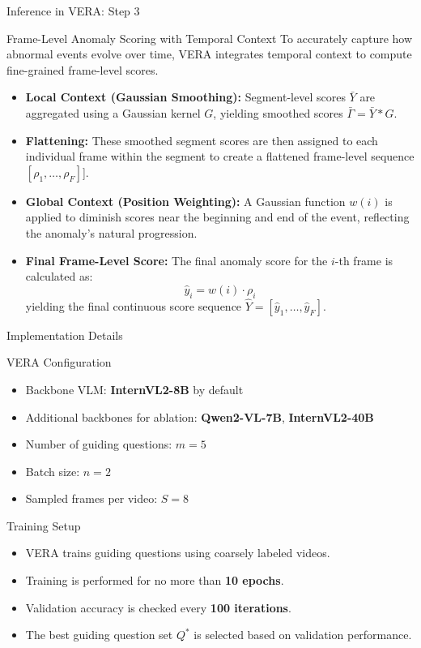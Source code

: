 \documentclass[aspectratio=169,xcolor=dvipsnames]{beamer}
\begin{document}
	
	\begin{frame}{Inference in VERA: Step 3}
		\small
		
		\begin{block}{Frame-Level Anomaly Scoring with Temporal Context}
			To accurately capture how abnormal events evolve over time, VERA integrates temporal context to compute fine-grained frame-level scores.
		\end{block}
		
		\begin{itemize}
			\item \textbf{Local Context (Gaussian Smoothing):} Segment-level scores $\bar{Y}$ are aggregated using a Gaussian kernel $G$, yielding smoothed scores $\bar{\Gamma} = \bar{Y} * G$.
			\item \textbf{Flattening:} These smoothed segment scores are then assigned to each individual frame within the segment to create a flattened frame-level sequence $[\rho_1, \dots, \rho_F]$].
			\item \textbf{Global Context (Position Weighting):} A Gaussian function $w(i)$ is applied to diminish scores near the beginning and end of the event, reflecting the anomaly's natural progression.
			\item \textbf{Final Frame-Level Score:} The final anomaly score for the $i$-th frame is calculated as:
			\[
			\hat{y}_i = w(i) \cdot \rho_i
			\]
			yielding the final continuous score sequence $\hat{Y} = [\hat{y}_1, \dots, \hat{y}_F]$.
		\end{itemize}
	\end{frame}
	\begin{frame}{Implementation Details}
		\small
		
		\begin{block}{VERA Configuration}
			\begin{itemize}
				\item Backbone VLM: \textbf{InternVL2-8B} by default
				\item Additional backbones for ablation: \textbf{Qwen2-VL-7B}, \textbf{InternVL2-40B}
				\item Number of guiding questions: \textbf{$m=5$}
				\item Batch size: \textbf{$n=2$}
				\item Sampled frames per video: \textbf{$S=8$}
			\end{itemize}
		\end{block}
		
		\begin{block}{Training Setup}
			\begin{itemize}
				\item VERA trains guiding questions using coarsely labeled videos.
				\item Training is performed for no more than \textbf{10 epochs}.
				\item Validation accuracy is checked every \textbf{100 iterations}.
				\item The best guiding question set $Q^*$ is selected based on validation performance.
			\end{itemize}
		\end{block}
	\end{frame}
\end{document}
